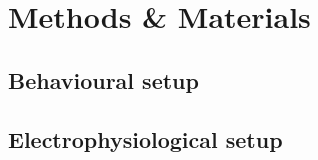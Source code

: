 \section{Methods \& Materials} \label{methods}

\subsection{Behavioural setup}
\lipsum[2]

\subsection{Electrophysiological setup}
\lipsum[2] 



